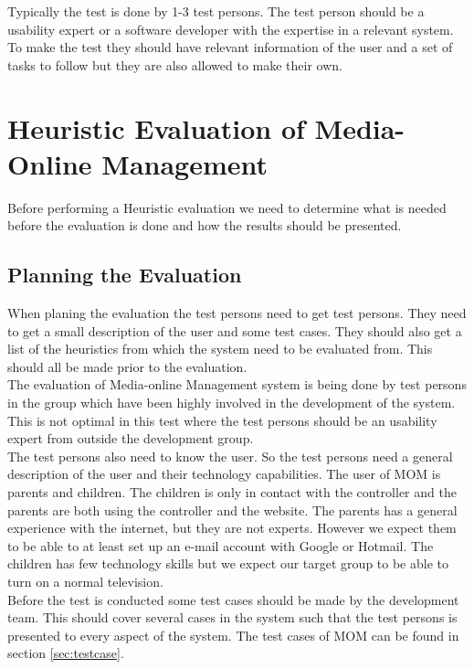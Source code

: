 Typically the test is done by 1-3 test persons\citep{HeuristicEvaluation}. The test person should be a usability expert or a software developer with the expertise in a relevant system. To make the test they should have relevant information of the user and a set of tasks to follow but they are also allowed to make their own.


\section{Heuristic Evaluation of Media-Online Management}
Before performing a Heuristic evaluation we need to determine what is needed before the evaluation is done and how the results should be presented\citep{HeuristicEvaluationGuide}.

\subsection{Planning the Evaluation}
When planing the evaluation the test persons need to get test persons. They need to get a small description of the user and some test cases. They should also get a list of the heuristics from which the system need to be evaluated from. This should all be made prior to the evaluation. \\

The evaluation of Media-online Management system is being done by test persons in the group which have been highly involved in the development of the system. This is not optimal in this test where the test persons should be an usability expert from outside the development group\citep{DIEB}.\\

The test persons also need to know the user. So the test persons need a general description of the user and their technology capabilities. The user of MOM is parents and children. The children is only in contact with the controller and the parents are both using the controller and the website. The parents has a general experience with the internet, but they are not experts. However we expect them to be able to at least set up an e-mail account with Google or Hotmail. The children has few technology skills but we expect our target group to be able to turn on a normal television. \\

Before the test is conducted some test cases should be made by the development team. This should cover several cases in the system such that the test persons is presented to every aspect of the system. The test cases of MOM can be found in section \vref{sec:testcase}.\\ 


